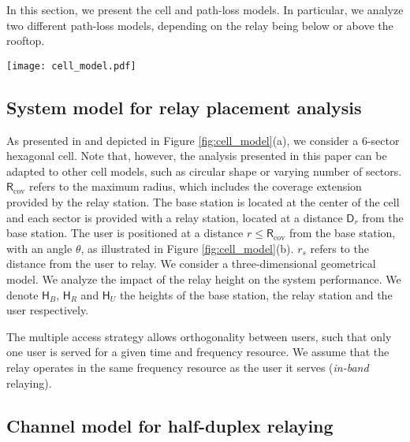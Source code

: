 \documentclass[journal]{IEEEtran}
\theoremstyle{definition}
\begin{document}
In this section, we present the cell and path-loss models. In particular, we analyze two different path-loss models, depending on the relay being below or above the rooftop. 


\begin{figure*}
\centering \texttt{[image: cell\_model.pdf]}
\vspace*{10pt}
\caption{System model for a 6-sector urban cell}
\label{fig:cell_model}
\end{figure*}


\subsection{System model for relay placement analysis}

As presented in \cite{Peters2009} and depicted in Figure \ref{fig:cell_model}(a), we consider a 6-sector hexagonal cell. Note that, however, the analysis presented in this paper can be adapted to other cell models, such as circular shape or varying number of sectors. 
 $\mathsf{R}_{\text{cov}}$ refers to the maximum radius, which includes the coverage extension provided by the relay station. 
The base station is located at the center of the cell and each sector is provided with a relay station, located at a distance $\mathsf{D}_r$ from the base station.
The user is positioned at a distance $r \leq \mathsf{R}_{\text{cov}}$ from the base station, with an angle $\theta$, as illustrated in Figure \ref{fig:cell_model}(b). $r_s$ refers to the distance from the user to relay.
We consider a three-dimensional geometrical model. We analyze the impact of the relay height on the system performance. We denote $\mathsf{H}_{B}$, $\mathsf{H}_{R}$ and $\mathsf{H}_{U}$ the heights of the base station, the relay station and the user respectively. 

The multiple access strategy allows orthogonality between users, such that only one user is served for a given time and frequency resource.
We assume that the relay operates in the same frequency resource as the user it serves (\textit{in-band} relaying).


\subsection{Channel model for half-duplex relaying}
\end{document}
